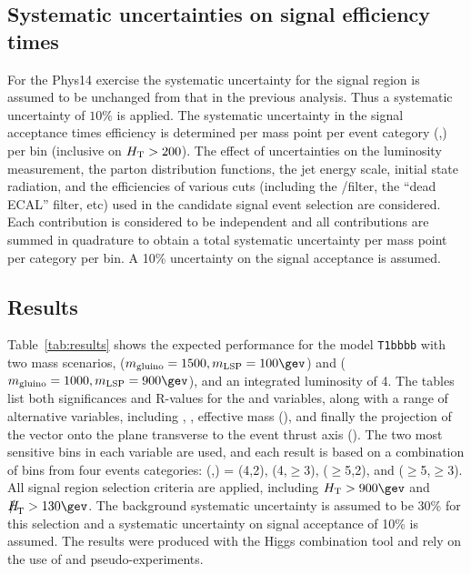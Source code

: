 \subsection{Systematic uncertainties on signal efficiency times}
\label{sec:sig-syst}

For the Phys14 exercise the systematic uncertainty for the signal region 
is assumed to be unchanged from that in the previous analysis. 
Thus a systematic uncertainty of $10\%$ is applied. The systematic 
uncertainty in the signal acceptance times efficiency is determined per mass 
point per event category (\njet,\nb) per
\scalht bin (inclusive on $\scalht > 200$). The effect of
uncertainties on the luminosity measurement, the parton distribution
functions, the jet energy scale, initial state radiation, and the
efficiencies of various cuts (including the \mht/\met filter, the
``dead ECAL'' filter, etc)
used in the candidate signal event selection are considered. Each
contribution is considered to be independent and all contributions are
summed in quadrature to obtain a total systematic uncertainty per mass
point per category per \scalht bin. A 10\% uncertainty on the signal
acceptance is assumed. 

\newpage

\subsection{Results}

Table~\ref{tab:results} shows
the expected performance for the model \verb!T1bbbb! with two mass
scenarios, ($m_{\rm gluino} = 1500,m_{\rm LSP} = 100\gev$) and
($m_{\rm gluino} = 1000,m_{\rm LSP} = 900\gev$), and an integrated
luminosity of 4\fbinv. The tables list both significances and R-values
for the \scalht and \alphat variables, along with a range of
alternative variables, including \mht, \met, effective mass (\meff),
and finally the projection of the \mht vector onto the plane
transverse to the event thrust axis (\mhttt). The two most sensitive
bins in each variable are used, and each result is based on a
combination of bins from four events categories: (\njet,\nb) = (4,2),
(4,$\geq$3), ($\geq$5,2), and ($\geq$5,$\geq$3). All signal region
selection criteria are applied, including $\scalht > 900\gev$ and
$\mht > 130\gev$. The background systematic uncertainty is assumed to
be 30\% for this selection and a systematic uncertainty on signal
acceptance of 10\% is assumed. The results were produced with the
Higgs combination tool and rely on the use of \cls and
pseudo-experiments.

